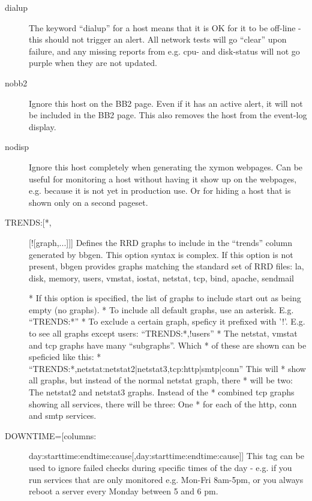 \begin{description}
 

\item[dialup] The keyword ``dialup'' for a host means that it is OK
  for it to be off-line - this should not trigger an alert. All
  network tests will go ``clear'' upon failure, and any missing
  reports from e.g. cpu- and disk-status will not go purple when they
  are not updated. 


 

\item[nobb2] Ignore this host on the BB2 page. Even if it has an
  active alert, it will not be included in the BB2 page. This also
  removes the host from the event-log display. 


 

\item[nodisp] Ignore this host completely when generating the xymon
  webpages. Can be useful for monitoring a host without having it show
  up on the webpages, e.g. because it is not yet in production use. Or
  for hiding a host that is shown only on a second pageset. 


 

\item[TRENDS:[*,][![graph,...]]] Defines the RRD graphs to include in the ``trends'' column generated by bbgen. This option syntax is complex.  
 If this option is not present, bbgen provides graphs matching the
 standard set of RRD files: la, disk, memory, users, vmstat, iostat,
 netstat, tcp, bind, apache, sendmail  

 * If this option is specified, the list of graphs to include start out as being empty (no graphs).  
 * To include all default graphs, use an asterisk. E.g. ``TRENDS:*''  
 * To exclude a certain graph, speficy it prefixed with '!'. E.g. to see all graphs except users: ``TRENDS:*,!users''  
 * The netstat, vmstat and tcp graphs have many ``subgraphs''. Which
 * of these are shown can be speficied like this:
 * ``TRENDS:*,netstat:netstat2|netstat3,tcp:http|smtp|conn'' This will
 * show all graphs, but instead of the normal netstat graph, there
 * will be two: The netstat2 and netstat3 graphs. Instead of the
 * combined tcp graphs showing all services, there will be three: One
 * for each of the http, conn and smtp services. 


 

\item[DOWNTIME=[columns:]day:starttime:endtime:cause[,day:starttime:endtime:cause]]
  This tag can be used to ignore failed checks during specific times
  of the day - e.g. if you run services that are only monitored
  e.g. Mon-Fri 8am-5pm, or you always reboot a server every Monday
  between 5 and 6 pm. 



\end{description}
